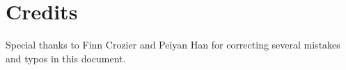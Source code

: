 \section{Credits}

Special thanks to Finn Crozier and Peiyan Han for correcting several mistakes and typos in this document.